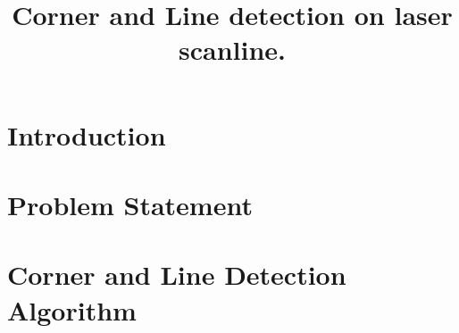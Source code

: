 
\usepackage{tikz}
\usepackage{wrapfig}
\usepackage{caption}
\usepackage{stfloats}
\usepackage{euscript} %
\DeclareMathAlphabet{}


\title{Corner and Line detection on laser scanline.}

\maketitle

\section{Introduction}


%

\section{Problem Statement}


\section{Corner and Line Detection Algorithm}		

		



\clearpage

%

\clearpage




